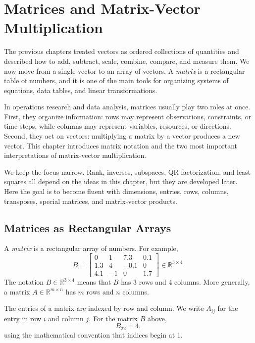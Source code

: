 \chapter{Matrices and Matrix-Vector Multiplication}
\label{mf:ch07-matrices-and-matrix-vector-multiplication}

The previous chapters treated vectors as ordered collections of quantities and described how to add, subtract, scale, combine, compare, and measure them. We now move from a single vector to an array of vectors. A \emph{matrix} is a rectangular table of numbers, and it is one of the main tools for organizing systems of equations, data tables, and linear transformations.

In operations research and data analysis, matrices usually play two roles at once. First, they organize information: rows may represent observations, constraints, or time steps, while columns may represent variables, resources, or directions. Second, they act on vectors: multiplying a matrix by a vector produces a new vector. This chapter introduces matrix notation and the two most important interpretations of matrix-vector multiplication.

We keep the focus narrow. Rank, inverses, subspaces, QR factorization, and least squares all depend on the ideas in this chapter, but they are developed later. Here the goal is to become fluent with dimensions, entries, rows, columns, transposes, special matrices, and matrix-vector products.

\section{Matrices as Rectangular Arrays}
\label{mf:matrices-dimensions}

A \emph{matrix} is a rectangular array of numbers. For example,
\[
    B =
    \begin{bmatrix}
        0 & 1 & 7.3 & 0.1\\
        1.3 & 4 & -0.1 & 0\\
        4.1 & -1 & 0 & 1.7
    \end{bmatrix}
    \in \mathbb{R}^{3\times 4}.
\]
The notation \(B\in\mathbb{R}^{3\times 4}\) means that \(B\) has 3 rows and 4 columns. More generally, a matrix \(A\in\mathbb{R}^{m\times n}\) has \(m\) rows and \(n\) columns.

The entries of a matrix are indexed by row and column. We write \(A_{ij}\) for the entry in row \(i\) and column \(j\). For the matrix \(B\) above,
\[
    B_{22}=4,
\]
using the mathematical convention that indices begin at 1.


